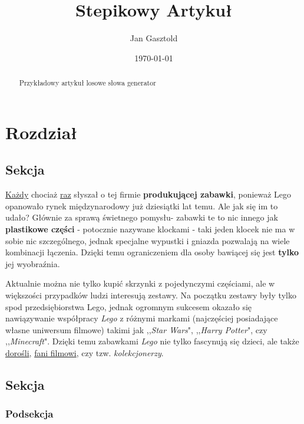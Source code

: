\documentclass{article}
\title{Stepikowy Artykuł}
\author{Jan Gasztold}
\date{\today}
\begin{document}
\maketitle

\begin{abstract}
    Przykładowy artykuł losowe słowa generator
\end{abstract}

\section{Rozdział}

\subsection{Sekcja}

\underline{Każdy} chociaż \underline{raz} słyszał o tej firmie \textbf{produkującej zabawki}, ponieważ Lego opanowało rynek międzynarodowy już dziesiątki lat temu. Ale jak się im to udało? Głównie za sprawą świetnego pomysłu- zabawki te to nic innego jak \textbf{plastikowe części} - potocznie nazywane klockami - taki jeden klocek nie ma w sobie nic szczególnego, jednak specjalne wypustki i gniazda pozwalają na wiele kombinacji łączenia. Dzięki temu ograniczeniem dla osoby bawiącej się jest \textbf{tylko} jej wyobraźnia.

Aktualnie można nie tylko kupić skrzynki z pojedynczymi częściami, ale w większości przypadków ludzi interesują zestawy. Na początku zestawy były tylko spod przedsiębiorstwa Lego, jednak ogromnym sukcesem okazało się nawiązywanie współpracy \textit{Lego} z różnymi markami (najczęściej posiadające własne uniwersum filmowe) takimi jak ,,\textit{Star Wars}", ,,\textit{Harry Potter}", czy ,,\textit{Minecraft}". Dzięki temu zabawkami \textit{Lego} nie tylko fascynują się dzieci, ale także \underline{dorośli}, \underline{fani filmowi}, czy tzw. \textit{kolekcjonerzy}. \cite{autor1}

\subsection{Sekcja}

\lipsum[1-2]

\subsubsection{Podsekcja}

\lipsum[1-2]
\end{document}
